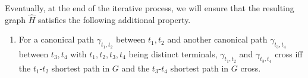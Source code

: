 \documentclass[11pt]{article}
\begin{document}
Eventually, at the end of the iterative process, we will ensure that the resulting graph $\hat H$ satisfies the following additional property.

\begin{enumerate}[resume]
\item For a canonical path $\gamma_{t_1,t_2}$ between $t_1,t_2$ and another canonical path $\gamma_{t_3,t_4}$ between $t_3,t_4$ with $t_1,t_2,t_3,t_4$ being distinct terminals, $\gamma_{t_1,t_2}$ and $\gamma_{t_3,t_4}$ cross iff the $t_1$-$t_2$ shortest path in $G$ and the $t_3$-$t_4$ shortest path in $G$ cross.
\label{prop: intersect iff}
\end{enumerate}







\end{document}
